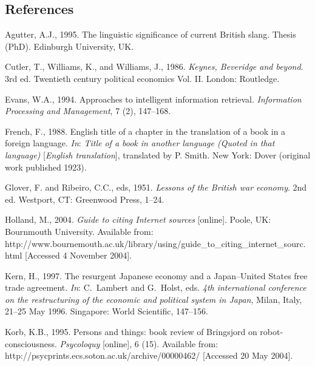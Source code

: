 \documentclass[]{tGIS2e}
\begin{document}
\subsection{References}\label{refs}
\begin{thebibliography}{9}


Agutter, A.J., 1995. The linguistic significance of current British slang.
  Thesis (PhD). Edinburgh University, UK.

Cutler, T., Williams, K., and Williams, J., 1986. {\itshape Keynes, Beveridge and
  beyond}. 3rd ed. Twentieth century political economics Vol. II. London:
  Routledge.

Evans, W.A., 1994. Approaches to intelligent information retrieval. {\itshape
  Information Processing and Management}, 7 (2), 147--168.

French, F., 1988. English title of a chapter in the translation of a book in a
  foreign language.  {\itshape{In}}: {\itshape Title of a book in another language (Quoted in
  that language)}  [{\itshape English translation}],  translated by P. Smith.
  New York: Dover (original work published 1923).

Glover, F. and Ribeiro, C.C., eds, 1951. {\itshape
Lessons of the British war economy}. 2nd ed. Westport, CT: Greenwood Press, 1--24.

Holland, M., 2004. {\itshape Guide to citing Internet sources} [online]. Poole, UK: Bournmouth University. Available from:
  http://www.bournemouth.ac.uk/library/using/guide\_to\_citing\_internet\_sourc.%
  html [Accessed 4 November 2004].

Kern, H., 1997. The resurgent Japanese economy and a Japan--United States free trade
  agreement. {\itshape {In}}: C.~Lambert and G.~Holst, eds. {\itshape 4th international conference on the restructuring of the economic and political system in Japan}, Milan, Italy, 21--25 May 1996. Singapore: World Scientific, 147--156.

Korb, K.B., 1995. Persons and things: book review of Bringsjord on
  robot-consciousness. {\itshape Psycoloquy} [online], 6 (15). Available from: http://psycprints.ecs.soton.ac.uk/archive/00000462/ [Accessed 20 May 2004].


\end{thebibliography}
\end{document}

